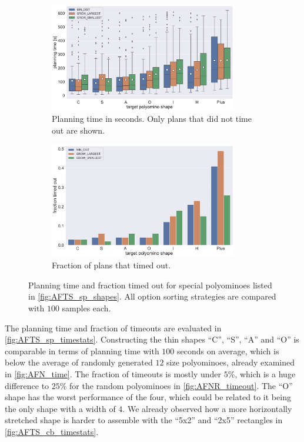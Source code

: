 \begin{figure}
	\centering
	\begin{subfigure}[b]{\textwidth}
		\centering
		\includegraphics[width=0.9\textwidth]{figures/plots/AFTS_sp_time.pdf}
		\caption{Planning time in seconds. Only plans that did not time out are shown.}
		\label{fig:AFTS_sp_time}
	\end{subfigure}
	
	\begin{subfigure}[b]{\textwidth}
		\centering
		\includegraphics[width=0.9\textwidth]{figures/plots/AFTS_sp_timeout.pdf}
		\caption{Fraction of plans that timed out.}
		\label{fig:AFTS_sp_timeout}
	\end{subfigure}
	\caption[Planning time and fraction timed out for special polyominoes]{Planning time and fraction timed out for special polyominoes listed in \autoref{fig:AFTS_sp_shapes}. All option sorting strategies are compared with $100$ samples each.}
	\label{fig:AFTS_sp_timestats}
\end{figure}

The planning time and fraction of timeouts are evaluated in \autoref{fig:AFTS_sp_timestats}.
Constructing the thin shapes ``C'', ``S'', ``A'' and ``O'' is comparable in terms of planning time with $100$ seconds on average, which is below the average of randomly generated $12$ size polyominoes, already examined in \autoref{fig:AFN_time}.
The fraction of timeouts is mostly under $5\%$, which is a huge difference to $25\%$ for the random polyominoes in \autoref{fig:AFNR_timeout}.
The ``O'' shape has the worst performance of the four, which could be related to it being the only shape with a width of 4.
We already observed how a more horizontally stretched shape is harder to assemble with the ``5x2'' and ``2x5'' rectangles in \autoref{fig:AFTS_cb_timestats}.


